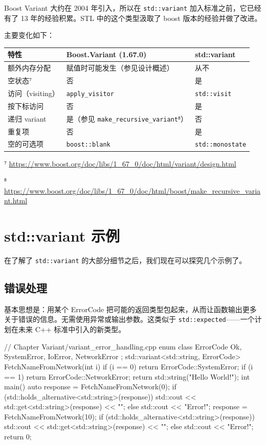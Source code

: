 Boost Variant 大约在 2004 年引入，所以在 \texttt{std::variant} 加入标准之前，它已经有了 13 年的经验积累。STL 中的这个类型汲取了 boost 版本的经验并做了改进。

主要变化如下：

\begin{table}[H]
\centering
\begin{tabularx}{\textwidth}{l X X}
\toprule
特性 & Boost.Variant (1.67.0) & std::variant \\
\midrule
额外内存分配 & 赋值时可能发生（参见设计概述） & 从不 \\
空状态⁷ & 否 & 是 \\
访问（visiting） & \texttt{apply\_visitor} & \texttt{std::visit} \\
按下标访问 & 否 & 是 \\
递归 variant & 是（参见 \texttt{make\_recursive\_variant}⁸） & 否 \\
重复项 & 否 & 是 \\
空的可选项 & \texttt{boost::blank} & \texttt{std::monostate} \\
\bottomrule
\end{tabularx}
\end{table}

\noindent ⁷ \url{https://www.boost.org/doc/libs/1_67_0/doc/html/variant/design.html}

\noindent ⁸ \url{https://www.boost.org/doc/libs/1_67_0/doc/html/boost/make_recursive_variant.html}

\section{std::variant 示例}

在了解了 \texttt{std::variant} 的大部分细节之后，我们现在可以探究几个示例了。

\subsection{错误处理}

基本思想是：用某个 ErrorCode 把可能的返回类型包起来，从而让函数输出更多关于错误的信息。无需使用异常或输出参数。这类似于 \texttt{std::expected}——一个计划在未来 C++ 标准中引入的新类型。

\begin{codebox}[cpp]
// Chapter Variant/variant_error_handling.cpp
enum class ErrorCode
{
Ok,
SystemError,
IoError,
NetworkError
};
std::variant<std::string, ErrorCode> FetchNameFromNetwork(int i)
{
if (i == 0)
return ErrorCode::SystemError;
if (i == 1)
return ErrorCode::NetworkError;
return std::string("Hello World!");
}
int main()
{
auto response = FetchNameFromNetwork(0);
if (std::holds_alternative<std::string>(response))
std::cout << std::get<std::string>(response) << "\n";
else
std::cout << "Error!\n";
response = FetchNameFromNetwork(10);
if (std::holds_alternative<std::string>(response))
std::cout << std::get<std::string>(response) << "\n";
else
std::cout << "Error!\n";
return 0;
}
\end{codebox}

